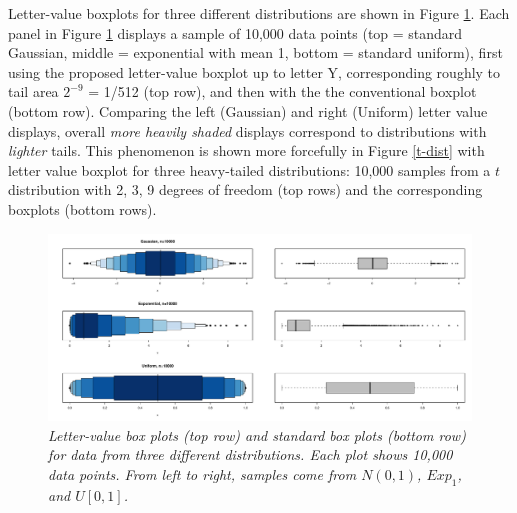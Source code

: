 \documentclass[11pt]{article}
\begin{document}
Letter-value boxplots for three different distributions are 
shown in Figure \ref{stackbox}. 
Each panel in Figure \ref{stackbox} displays a sample of 10,000 
data points (top = standard Gaussian, middle = exponential 
with mean 1, bottom = standard uniform),
first using the proposed letter-value boxplot
up to letter Y, corresponding roughly to tail area $2^{-9}$
= 1/512 (top row), and then with the
the conventional boxplot (bottom row).
Comparing the left (Gaussian) and right (Uniform) letter
value displays, overall \textit{more heavily shaded} displays 
correspond to distributions with \textit{lighter} tails.  
This phenomenon is shown more forcefully in 
Figure \ref{t-dist} with letter value boxplot for three heavy-tailed
distributions: 10,000 samples from a $t$ distribution with 2, 3, 9
degrees of freedom (top rows) and the corresponding boxplots
(bottom rows).

\begin{figure}[hbt]
\begin{center}
\includegraphics[scale=.5,angle=270]{boxplots}
\caption{\it \label{stackbox} Letter-value box plots (top row) and standard 
box plots (bottom row) for data from three different distributions. Each plot 
shows 10,000 data points.  From left to right, samples come from 
$N(0,1)$, $Exp_1$, and $U[0,1]$. }
\end{center}
\end{figure}
\end{document}
